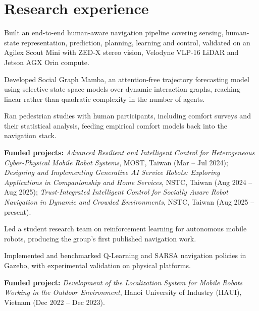 \documentclass[10pt]{article}
\begin{document}
\section{Research experience}

\begin{achievements}
  \item Built an end-to-end human-aware navigation pipeline covering sensing,
        human-state representation, prediction, planning, learning and control,
        validated on an Agilex Scout Mini with ZED-X stereo vision, Velodyne
        VLP-16 LiDAR and Jetson AGX Orin compute.
  \item Developed Social Graph Mamba, an attention-free trajectory forecasting
        model using selective state space models over dynamic interaction graphs,
        reaching linear rather than quadratic complexity in the number of agents.
  \item Ran pedestrian studies with human participants, including comfort surveys
        and their statistical analysis, feeding empirical comfort models back into
        the navigation stack.
\end{achievements}
\begin{detail}
{\fontsize{9}{11.5}\selectfont\textbf{Funded projects:} \emph{Advanced Resilient and
Intelligent Control for Heterogeneous Cyber-Physical Mobile Robot Systems}, MOST,
Taiwan (Mar -- Jul 2024); \emph{Designing and Implementing Generative AI Service
Robots: Exploring Applications in Companionship and Home Services}, NSTC, Taiwan
(Aug 2024 -- Aug 2025); \emph{Trust-Integrated Intelligent Control for Socially
Aware Robot Navigation in Dynamic and Crowded Environments}, NSTC, Taiwan
(Aug 2025 -- present).}
\end{detail}

\begin{achievements}
  \item Led a student research team on reinforcement learning for autonomous
        mobile robots, producing the group's first published navigation work.
  \item Implemented and benchmarked Q-Learning and SARSA navigation policies in
        Gazebo, with experimental validation on physical platforms.
\end{achievements}
\begin{detail}
{\fontsize{9}{11.5}\selectfont\textbf{Funded project:} \emph{Development of the
Localization System for Mobile Robots Working in the Outdoor Environment},
Hanoi University of Industry (HAUI), Vietnam (Dec 2022 -- Dec 2023).}
\end{detail}
\end{document}
